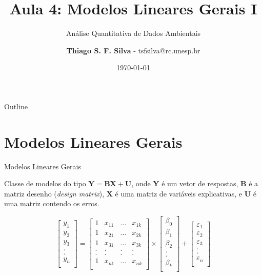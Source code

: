\documentclass{beamer}\usepackage[]{graphicx}\usepackage[]{color}
\title{Aula 4: Modelos Lineares Gerais I}
\subtitle{Análise Quantitativa de Dados Ambientais}
\author{\textbf{Thiago S. F. Silva} - tsfsilva@rc.unesp.br}
\institute{Programa de Pós Graduação em Geografia - IGCE/UNESP}
\date{\today}
\begin{document}
\begin{frame}[plain] %
  \titlepage
\end{frame}

\begin{frame}{Outline}
  \tableofcontents
\end{frame}

\section{Modelos Lineares Gerais}


\begin{frame}{Modelos Lineares Gerais}

Classe de modelos do tipo $\mathbf{Y = BX + U}$, onde $\mathbf{Y}$ é um vetor de respostas, $\mathbf{B}$ é a matriz desenho (\emph{design matrix}), $\mathbf{X}$ é uma matriz de variáveis explicativas, e $\mathbf{U}$ é uma matriz contendo os erros.

\begin{equation*}
\begin{bmatrix}
  y_1\\
  y_2\\
  y_3\\
  . \\
  . \\
  y_n\\
  \end{bmatrix}
=
\begin{bmatrix}
  1 & x_{11} & \dots & x_{1k} \\
  1 & x_{21} & \dots & x_{2k} \\
  1 & x_{31} & \dots & x_{3k} \\
  . & . & . & . \\
  . & . & . & . \\
  1 & x_{n1} & \dots & x_{nk} \\
  \end{bmatrix}
\times
\begin{bmatrix}
  \beta_0 \\
  \beta_1 \\
  \beta_2 \\
  . \\
  . \\
  \beta_k \\
  \end{bmatrix}
+
\begin{bmatrix}
  \varepsilon_1 \\
  \varepsilon_2 \\
  \varepsilon_3 \\
  . \\
  . \\
  \varepsilon_n \\
  \end{bmatrix}
\end{equation*}

\end{frame}
\end{document}

